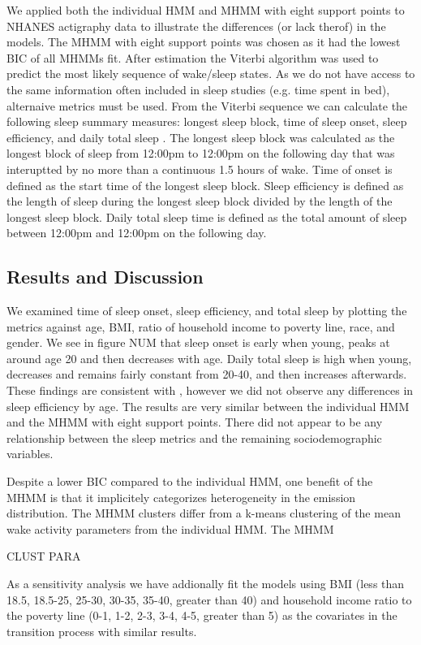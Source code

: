 \documentclass{article}
\begin{document}
We applied both the individual HMM and MHMM with eight support points to NHANES actigraphy data to illustrate the differences (or lack therof) in the models. The MHMM with eight support points was chosen as it had the lowest BIC of all MHMMs fit. After estimation the Viterbi algorithm was used to predict the most likely sequence of wake/sleep states. As we do not have access to the same information often included in sleep studies (e.g. time spent in bed), alternaive metrics must be used. From the Viterbi sequence we can calculate the following sleep summary measures: longest sleep block, time of sleep onset, sleep efficiency, and daily total sleep \cite{Su2022}. The longest sleep block was calculated as the longest block of sleep from 12:00pm to 12:00pm on the following day that was interuptted by no more than a continuous 1.5 hours of wake. Time of onset is defined as the start time of the longest sleep block. Sleep efficiency is defined as the length of sleep during the longest sleep block divided by the length of the longest sleep block. Daily total sleep time is defined as the total amount of sleep between 12:00pm and 12:00pm on the following day.

\subsection{Results and Discussion}

We examined time of sleep onset, sleep efficiency, and total sleep by plotting the metrics against age, BMI, ratio of household income to poverty line, race, and gender. We see in figure NUM that sleep onset is early when young, peaks at around age 20 and then decreases with age. Daily total sleep is high when young, decreases and remains fairly constant from 20-40, and then increases afterwards. These findings are consistent with \cite{Su2022}, however we did not observe any differences in sleep efficiency by age. The results are very similar between the individual HMM and the MHMM with eight support points. There did not appear to be any relationship between the sleep metrics and the remaining sociodemographic variables. 

Despite a lower BIC compared to the individual HMM, one benefit of the MHMM is that it implicitely categorizes heterogeneity in the emission distribution. The MHMM clusters differ from a k-means clustering of the mean wake activity parameters from the individual HMM. The MHMM 

CLUST PARA

As a sensitivity analysis we have addionally fit the models using BMI (less than 18.5, 18.5-25, 25-30, 30-35, 35-40, greater than 40) and household income ratio to the poverty line (0-1, 1-2, 2-3, 3-4, 4-5, greater than 5) as the covariates in the transition process with similar results. 
\end{document}
